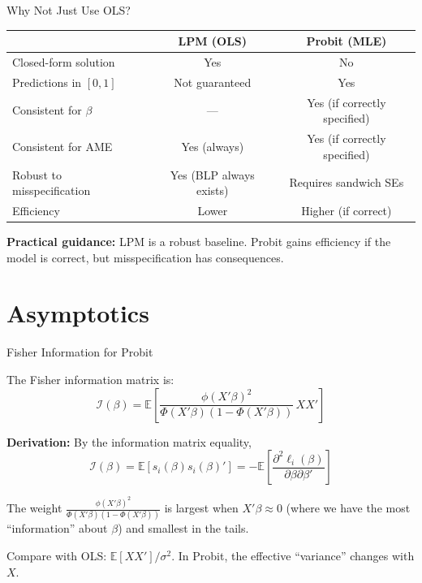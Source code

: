 \documentclass[aspectratio=169]{beamer}
\numberwithin{equation}{section}
\begin{document}
\begin{frame}{Why Not Just Use OLS?}

\begin{center}
\renewcommand{\arraystretch}{1.4}
\begin{tabular}{lcc}
\toprule
& \textbf{LPM (OLS)} & \textbf{Probit (MLE)} \\
\midrule
Closed-form solution & Yes & No \\
Predictions in $[0,1]$ & Not guaranteed & Yes \\
Consistent for $\beta$ & --- & Yes (if correctly specified) \\
Consistent for AME & Yes (always) & Yes (if correctly specified) \\
Robust to misspecification & Yes (BLP always exists) & Requires sandwich SEs \\
Efficiency & Lower & Higher (if correct) \\
\bottomrule
\end{tabular}
\renewcommand{\arraystretch}{1.0}
\end{center}

\pause

\begin{tcolorbox}[colback=blue!5, colframe=blue!50]
\textbf{Practical guidance:} LPM is a robust baseline. Probit gains efficiency if the model is correct, but misspecification has consequences.
\end{tcolorbox}

\end{frame}

\section{Asymptotics}

\begin{frame}{Fisher Information for Probit}

The Fisher information matrix is:
\[
\mathcal{I}(\beta)
=
\mathbb{E}\left[\frac{\phi(X'\beta)^2}{\Phi(X'\beta)(1-\Phi(X'\beta))} \, XX'\right]
\]

\pause

\textbf{Derivation:} By the information matrix equality,
\[
\mathcal{I}(\beta) = \mathbb{E}[s_i(\beta) s_i(\beta)'] = -\mathbb{E}\left[\frac{\partial^2 \ell_i(\beta)}{\partial \beta \partial \beta'}\right]
\]

\pause

The weight $\frac{\phi(X'\beta)^2}{\Phi(X'\beta)(1-\Phi(X'\beta))}$ is largest when $X'\beta \approx 0$ (where we have the most ``information'' about $\beta$) and smallest in the tails.

\pause

\bigskip

Compare with OLS: $\mathbb{E}[X X'] / \sigma^2$. In Probit, the effective ``variance'' changes with $X$.

\end{frame}
\end{document}
